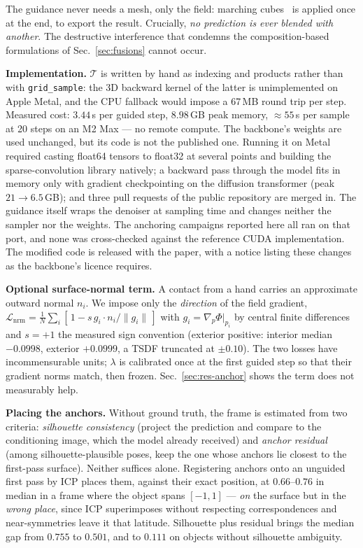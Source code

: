 \documentclass[conference]{IEEEtran}
\begin{document}
The guidance never needs a mesh, only the field: marching cubes~\cite{marchingcubes}
is applied once at the end, to export the result. Crucially, \emph{no prediction is
ever blended with another}. The destructive interference that condemns the
composition-based formulations of Sec.~\ref{sec:fusions} cannot occur.

\textbf{Implementation.} $\mathcal{T}$ is written by hand as indexing and products
rather than with \texttt{grid\_sample}: the 3D backward kernel of the latter is
unimplemented on Apple Metal, and the CPU fallback would impose a 67\,MB round trip
per step. Measured cost: $3.44$\,s per guided step, $8.98$\,GB peak memory, $\approx
55$\,s per sample at 20 steps on an M2 Max --- no remote compute. The backbone's
weights are used unchanged, but its code is not the published one. Running it on Metal
required casting float64 tensors to float32 at several points and building the
sparse-convolution library natively; a backward pass through the model fits in memory
only with gradient checkpointing on the diffusion transformer (peak $21 \rightarrow
6.5$\,GB); and three pull requests of the public repository are merged in. The guidance
itself wraps the denoiser at sampling time and changes neither the sampler nor the
weights. The anchoring campaigns reported here all ran on that port, and none was
cross-checked against the reference CUDA implementation. The modified code is released
with the paper, with a notice listing these changes as the backbone's licence requires.

\textbf{Optional surface-normal term.} A contact from a hand carries an approximate
outward normal $n_i$. We impose only the \emph{direction} of the field gradient,
$\mathcal{L}_{\text{nrm}} = \frac{1}{N}\sum_i [\,1 - s\, g_i\!\cdot n_i / \lVert g_i
\rVert\,]$ with $g_i = \nabla_{\!p}\Phi|_{p_i}$ by central finite differences and $s =
+1$ the measured sign convention (exterior positive: interior median $-0.0998$,
exterior $+0.0999$, a TSDF truncated at $\pm 0.10$). The two losses have
incommensurable units; $\lambda$ is calibrated once at the first guided step so that
their gradient norms match, then frozen. Sec.~\ref{sec:res-anchor} shows the term does
not measurably help.

\textbf{Placing the anchors.} Without ground truth, the frame is estimated from two
criteria: \emph{silhouette consistency} (project the prediction and compare to the
conditioning image, which the model already received) and \emph{anchor residual}
(among silhouette-plausible poses, keep the one whose anchors lie closest to the
first-pass surface). Neither suffices alone. Registering anchors onto an unguided first
pass by ICP places them, against their exact position, at $0.66$--$0.76$ in median in
a frame where the object spans $[-1,1]$ --- \emph{on} the surface but in the
\emph{wrong place}, since ICP superimposes without respecting correspondences and
near-symmetries leave it that latitude. Silhouette plus residual brings the median gap
from $0.755$ to $0.501$, and to $0.111$ on objects without silhouette ambiguity.
\end{document}
